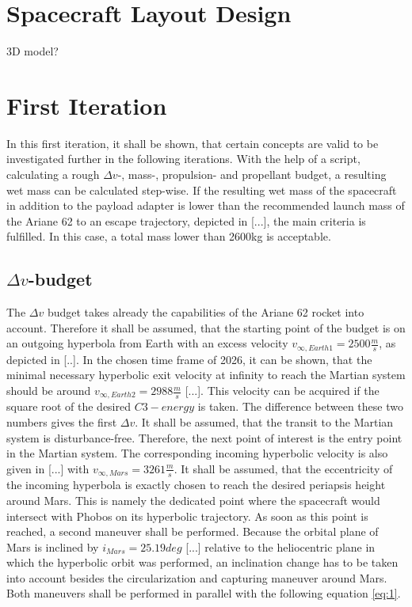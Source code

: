 \section{Spacecraft Layout Design}
3D model?


\newpage
\section{First Iteration}
In this first iteration, it shall be shown, that certain concepts are valid to be investigated further in the following iterations. With the help of a script, calculating a rough $\Delta v$-, mass-, propulsion- and propellant budget, a resulting wet mass can be calculated step-wise. If the resulting wet mass of the spacecraft in addition to the payload adapter is lower than the recommended launch mass of the Ariane 62 to an escape trajectory, depicted in [...], the main criteria is fulfilled. In this case, a total mass lower than 2600kg is acceptable.    

\subsection{$\Delta v$-budget}
The $\Delta v$ budget takes already the capabilities of the Ariane 62 rocket into account. Therefore it shall be assumed, that the starting point of the budget is on an outgoing hyperbola from Earth with an excess velocity $v_{\infty,Earth1} = 2500\frac{m}{s}$, as depicted in [..]. In the chosen time frame of 2026, it can be shown, that the minimal necessary hyperbolic exit velocity at infinity to reach the Martian system should be around $v_{\infty,Earth2} = 2988 \frac{m}{s}$ [...]. This velocity can be acquired if the square root of the desired $C3-energy$ is taken. The difference between these two numbers gives the first $\Delta v$. It shall be assumed, that the transit to the Martian system is disturbance-free. Therefore, the next point of interest is the entry point in the Martian system. The corresponding incoming hyperbolic velocity is also given in [...] with $v_{\infty,Mars} = 3261 \frac{m}{s}$. It shall be assumed, that the eccentricity of the incoming hyperbola is exactly chosen to reach the desired periapsis height around Mars. This is namely the dedicated point where the spacecraft would intersect with Phobos on its hyperbolic trajectory. As soon as this point is reached, a second maneuver shall be performed. Because the orbital plane of Mars is inclined by $i_{Mars} = 25.19 deg$ [...] relative to the heliocentric plane in which the hyperbolic orbit was performed, an inclination change has to be taken into account besides the circularization and capturing maneuver around Mars. Both maneuvers shall be performed in parallel with the following equation \ref{eq:1}.

